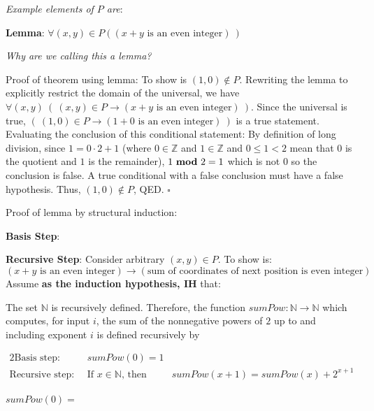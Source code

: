 \documentclass[12pt, oneside]{article}
\begin{document}
{\it Example elements of $P$ are}:
\vspace{40pt}

{\bf Lemma}: $\forall (x,y) \in P( (x+y \textrm{ is an even integer})~)$

{\it Why are we calling this a lemma?}


Proof of theorem using lemma: To show is $(1,0) \notin P$. Rewriting the lemma to explicitly 
restrict the domain of the universal, 
we have $\forall (x,y) ~(~ (x,y) \in P  \to (x+y \textrm{ is an even integer})~)$.  Since
the universal is true, 
$ (~ (1,0) \in P \to (1+0 \textrm{ is an even integer})~)$ is a true statement.
Evaluating the conclusion of this conditional statement: 
By definition of long division, since $1 = 0 \cdot 2 + 1$ (where $0 \in \mathbb{Z}$ and 
$1 \in \mathbb{Z}$ and $0 \leq 1 < 2$ mean that $0$ is the quotient and $1$ is the remainder), $1 ~\textrm{\bf mod}~ 2 = 1$ which is not $0$ 
so the conclusion is false.  A true conditional with a false conclusion must have a false hypothesis.
Thus, $(1,0) \notin P$, QED. $\square$

\vspace{20pt}

Proof of lemma by structural induction:

{\bf Basis Step}:

\vspace{100pt}


{\bf Recursive Step}:  Consider arbitrary $(x,y) \in P$.  To show is:
\[
(x+y \text{ is an even integer}) \to (\text{sum of coordinates of next position is even integer})
\]
Assume {\bf as the induction hypothesis, IH} that: 


\vspace{400pt} \newpage


The set $\mathbb{N}$ is recursively defined.
Therefore, the function $sumPow: \mathbb{N} \to \mathbb{N}$
which computes, for input $i$, the sum of the nonnegative powers of $2$
up to and including exponent $i$ is defined
recursively by

\begin{alignat*}{2}
    \text{Basis step:  } \qquad & sumPow(0) = 1 &\\
    \text{Recursive step:  } & \text{If } x \in \mathbb{N} \text{, then } &sumPow(x+1) = sumPow(x) + 2^{x+1}
\end{alignat*}

$sumPow(0) =$

\vspace{20pt}
\end{document}
